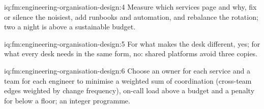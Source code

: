 \begin{solution}{iq:fm:engineering-organisation-design:4}
Measure which services page and why, fix or silence the noisiest, add runbooks and automation, and rebalance the rotation; two a night is above a
sustainable budget.
\end{solution}

\begin{solution}{iq:fm:engineering-organisation-design:5}
For what makes the desk different, yes; for what every desk needs in the same form, no: shared platforms avoid three copies.
\end{solution}

\begin{solution}{iq:fm:engineering-organisation-design:6}
Choose an owner for each service and a team for each engineer to minimise a weighted sum of coordination (cross-team edges weighted by change
frequency), on-call load above a budget and a penalty for  below a floor; an integer programme.
\end{solution}

